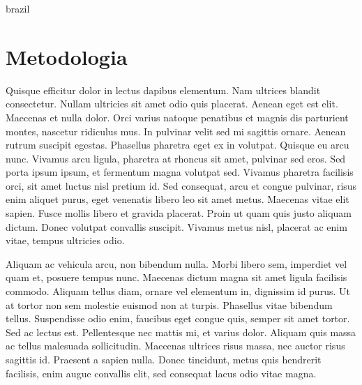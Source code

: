 \begin{otherlanguage*}{brazil}
        \section*{Metodologia}
        Quisque efficitur dolor in lectus dapibus elementum. Nam ultrices blandit consectetur.
        Nullam ultricies sit amet odio quis placerat. Aenean eget est elit. Maecenas et nulla dolor.
        Orci varius natoque penatibus et magnis dis parturient montes, nascetur ridiculus mus. In
        pulvinar velit sed mi sagittis ornare. Aenean rutrum suscipit egestas. Phasellus pharetra
        eget ex in volutpat. Quisque eu arcu nunc. Vivamus arcu ligula, pharetra at rhoncus sit
        amet, pulvinar sed eros. Sed porta ipsum ipsum, et fermentum magna volutpat sed. Vivamus
        pharetra facilisis orci, sit amet luctus nisl pretium id. Sed consequat, arcu et congue
        pulvinar, risus enim aliquet purus, eget venenatis libero leo sit amet metus. Maecenas vitae
        elit sapien. Fusce mollis libero et gravida placerat. Proin ut quam quis justo aliquam
        dictum. Donec volutpat convallis suscipit. Vivamus metus nisl, placerat ac enim vitae,
        tempus ultricies odio.

        Aliquam ac vehicula arcu, non bibendum nulla. Morbi libero sem,
        imperdiet vel quam et, posuere tempus nunc. Maecenas dictum magna sit amet ligula facilisis
        commodo. Aliquam tellus diam, ornare vel elementum in, dignissim id purus. Ut at tortor non
        sem molestie euismod non at turpis. Phasellus vitae bibendum tellus. Suspendisse odio enim,
        faucibus eget congue quis, semper sit amet tortor. Sed ac lectus est. Pellentesque nec
        mattis mi, et varius dolor. Aliquam quis massa ac tellus malesuada sollicitudin. Maecenas
        ultrices risus massa, nec auctor risus sagittis id. Praesent a sapien nulla. Donec
        tincidunt, metus quis hendrerit facilisis, enim augue convallis elit, sed consequat lacus
        odio vitae magna.


\end{otherlanguage*}
